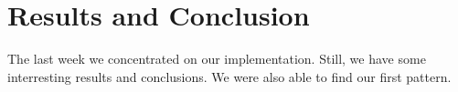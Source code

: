 \section{Results and Conclusion}

The last week we concentrated on our implementation.
Still, we have some interresting results and conclusions. We were also able to find our first pattern.
\newline


